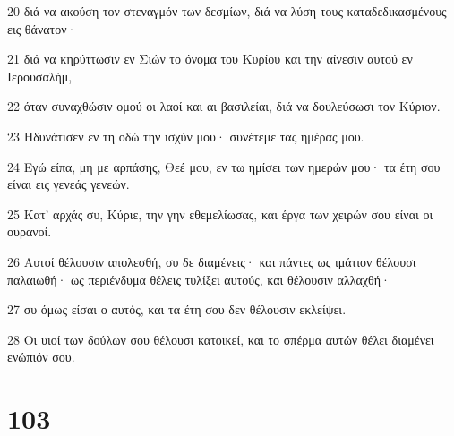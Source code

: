 \par 20 διά να ακούση τον στεναγμόν των δεσμίων, διά να λύση τους καταδεδικασμένους εις θάνατον·
\par 21 διά να κηρύττωσιν εν Σιών το όνομα του Κυρίου και την αίνεσιν αυτού εν Ιερουσαλήμ,
\par 22 όταν συναχθώσιν ομού οι λαοί και αι βασιλείαι, διά να δουλεύσωσι τον Κύριον.
\par 23 Ηδυνάτισεν εν τη οδώ την ισχύν μου· συνέτεμε τας ημέρας μου.
\par 24 Εγώ είπα, μη με αρπάσης, Θεέ μου, εν τω ημίσει των ημερών μου· τα έτη σου είναι εις γενεάς γενεών.
\par 25 Κατ' αρχάς συ, Κύριε, την γην εθεμελίωσας, και έργα των χειρών σου είναι οι ουρανοί.
\par 26 Αυτοί θέλουσιν απολεσθή, συ δε διαμένεις· και πάντες ως ιμάτιον θέλουσι παλαιωθή· ως περιένδυμα θέλεις τυλίξει αυτούς, και θέλουσιν αλλαχθή·
\par 27 συ όμως είσαι ο αυτός, και τα έτη σου δεν θέλουσιν εκλείψει.
\par 28 Οι υιοί των δούλων σου θέλουσι κατοικεί, και το σπέρμα αυτών θέλει διαμένει ενώπιόν σου.

\chapter{103}

